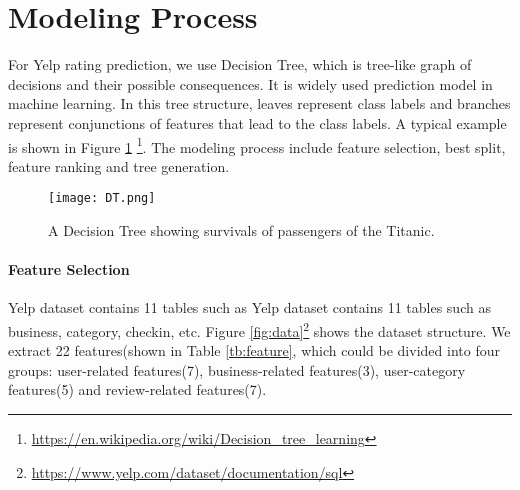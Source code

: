 \section{Modeling Process}
\label{sec:modeling} 


For Yelp rating prediction, we use Decision Tree, which is tree-like graph of decisions and their possible consequences. It is widely used prediction model in machine learning. In this tree structure, leaves represent class labels and branches represent conjunctions of features that lead to the class labels. A typical example is shown in Figure \ref{fig:DT} \footnote{\url{https://en.wikipedia.org/wiki/Decision_tree_learning}}. The modeling process include feature selection, best split, feature ranking and tree generation. 

\begin{figure}[h]
	\centering
	\texttt{[image: DT.png]}
	\caption{A Decision Tree showing survivals of passengers of the Titanic.}
	\label{fig:DT}
\end{figure}

\paragraph{Feature Selection}
Yelp dataset contains 11 tables such as Yelp dataset contains 11 tables such as business, category, checkin, etc. Figure \ref{fig:data}\footnote{\url{https://www.yelp.com/dataset/documentation/sql}} shows the dataset structure. We extract 22 features(shown in Table \ref{tb:feature}, which could be divided into four groups: user-related features(7), business-related features(3), user-category features(5) and review-related features(7).

